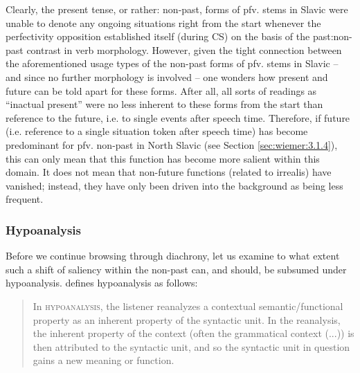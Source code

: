 \documentclass[output=paper,colorlinks,citecolor=brown]{langscibook}
\begin{document}
Clearly, the present tense, or rather: non-past, forms of pfv. stems in Slavic were unable to denote any ongoing situations right from the start whenever the perfectivity opposition established itself (during CS) on the basis of the past:non-past contrast in verb morphology. However, given the tight connection between the aforementioned usage types of the non-past forms of pfv. stems in Slavic – and since no further morphology is involved – one wonders how present and future can be told apart for these forms. After all, all sorts of readings as “inactual present” were no less inherent to these forms from the start than reference to the future, i.e. to single events after speech time. Therefore, if future (i.e. reference to a single situation token after speech time) has become predominant for pfv. non-past in North Slavic (see Section \ref{sec:wiemer:3.1.4}), this can only mean that this function has become more salient within this domain. It does not mean that non-future functions (related to irrealis) have vanished; instead, they have only been driven into the background as being less frequent.

\subsubsection{Hypoanalysis}\label{sec:wiemer:3.1.3}

Before we continue browsing through diachrony, let us examine to what extent such a shift of saliency within the non-past can, and should, be subsumed under hypoanalysis. \citet[126--127]{Croft2000} defines hypoanalysis as follows:

\begin{quote}
In \textsc{hypoanalysis}, the listener reanalyzes a contextual semantic/functional property as an inherent property of the syntactic unit. In the reanalysis, the inherent property of the context (often the grammatical context (...)) is then attributed to the syntactic unit, and so the syntactic unit in question gains a new meaning or function.
\end{quote}
\end{document}
